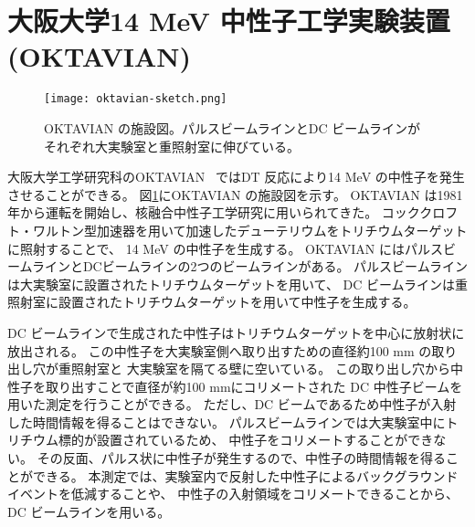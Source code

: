\documentclass[../master]{subfiles}
\begin{document}
\section{大阪大学14 MeV 中性子工学実験装置 (OKTAVIAN)}
\begin{figure}
  \centering
  \texttt{[image: oktavian-sketch.png]}
  \caption[OKTAVIAN の施設図。]
          {OKTAVIAN の施設図。パルスビームラインとDC ビームラインがそれぞれ大実験室と重照射室に伸びている。}
  \label{pic::oktavian-sketch}
\end{figure}
大阪大学工学研究科のOKTAVIAN~\cite{oktavian} ではDT 反応により14 MeV の中性子を発生させることができる。
図\ref{pic::oktavian-sketch}にOKTAVIAN の施設図を示す。
OKTAVIAN は1981年から運転を開始し、核融合中性子工学研究に用いられてきた。
コッククロフト・ワルトン型加速器を用いて加速したデューテリウムをトリチウムターゲットに照射することで、
14 MeV の中性子を生成する。
OKTAVIAN にはパルスビームラインとDCビームラインの2つのビームラインがある。
パルスビームラインは大実験室に設置されたトリチウムターゲットを用いて、
DC ビームラインは重照射室に設置されたトリチウムターゲットを用いて中性子を生成する。

DC ビームラインで生成された中性子はトリチウムターゲットを中心に放射状に放出される。
この中性子を大実験室側へ取り出すための直径約100 mm の取り出し穴が重照射室と
大実験室を隔てる壁に空いている。
この取り出し穴から中性子を取り出すことで直径が約100 mmにコリメートされた
DC 中性子ビームを用いた測定を行うことができる。
ただし、DC ビームであるため中性子が入射した時間情報を得ることはできない。
パルスビームラインでは大実験室中にトリチウム標的が設置されているため、
中性子をコリメートすることができない。
その反面、パルス状に中性子が発生するので、中性子の時間情報を得ることができる。
本測定では、実験室内で反射した中性子によるバックグラウンドイベントを低減することや、
中性子の入射領域をコリメートできることから、DC ビームラインを用いる。
\end{document}
